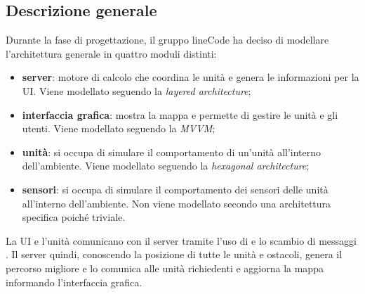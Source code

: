 \subsection{Descrizione generale}
Durante la fase di progettazione, il gruppo lineCode ha deciso di modellare l'architettura generale in quattro moduli distinti:
\begin{itemize}
	\item \textbf{server}: motore di calcolo che coordina le unità e genera le informazioni per la UI. Viene modellato seguendo la \textit{layered architecture};
	\item \textbf{interfaccia grafica}: mostra la mappa e permette di gestire le unità e gli utenti. Viene modellato seguendo la \textit{MVVM};
	\item \textbf{unità}: si occupa di simulare il comportamento di un'unità all'interno dell'ambiente. Viene modellato seguendo la \textit{hexagonal architecture};
	\item \textbf{sensori}: si occupa di simulare il comportamento dei sensori delle unità all'interno dell'ambiente. Non viene modellato secondo una architettura specifica poiché triviale.
\end{itemize}
La UI e l'unità comunicano con il server tramite l'uso di  e lo scambio di messaggi . Il server quindi, conoscendo la posizione di tutte le unità e ostacoli, genera il percorso migliore e lo comunica alle unità richiedenti e aggiorna la mappa informando l'interfaccia grafica. 
